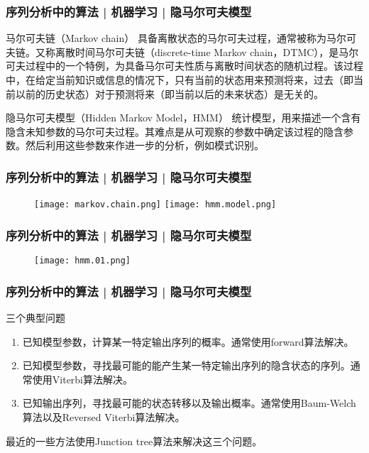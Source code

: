 \begin{frame}
  \frametitle{序列分析中的算法 | 机器学习 | 隐马尔可夫模型}
  \begin{block}{马尔可夫链（Markov chain）}
    具备离散状态的马尔可夫过程，通常被称为马尔可夫链。又称离散时间马尔可夫链（discrete-time Markov chain，DTMC），是马尔可夫过程中的一个特例，为具备马尔可夫性质与离散时间状态的随机过程。该过程中，在给定当前知识或信息的情况下，只有当前的状态用来预测将来，过去（即当前以前的历史状态）对于预测将来（即当前以后的未来状态）是无关的。
  \end{block}
  \pause
  \begin{block}{隐马尔可夫模型（Hidden Markov Model，HMM）}
    统计模型，用来描述一个含有隐含未知参数的马尔可夫过程。其难点是从可观察的参数中确定该过程的隐含参数。然后利用这些参数来作进一步的分析，例如模式识别。
  \end{block}
\end{frame}

\begin{frame}
  \frametitle{序列分析中的算法 | 机器学习 | 隐马尔可夫模型}
  \begin{figure}
    \centering
    \texttt{[image: markov.chain.png]}
    \quad
    \texttt{[image: hmm.model.png]}
  \end{figure}
\end{frame}

\begin{frame}
  \frametitle{序列分析中的算法 | 机器学习 | 隐马尔可夫模型}
  \begin{figure}
    \centering
    \texttt{[image: hmm.01.png]}
  \end{figure}
\end{frame}

\begin{frame}
  \frametitle{序列分析中的算法 | 机器学习 | 隐马尔可夫模型}
  \begin{block}{三个典型问题}
    \begin{enumerate}
      \item 已知模型参数，计算某一特定输出序列的概率。通常使用forward算法解决。
      \item 已知模型参数，寻找最可能的能产生某一特定输出序列的隐含状态的序列。通常使用Viterbi算法解决。
      \item 已知输出序列，寻找最可能的状态转移以及输出概率。通常使用Baum-Welch算法以及Reversed Viterbi算法解决。
    \end{enumerate}
  \end{block}
最近的一些方法使用Junction tree算法来解决这三个问题。
\end{frame}

